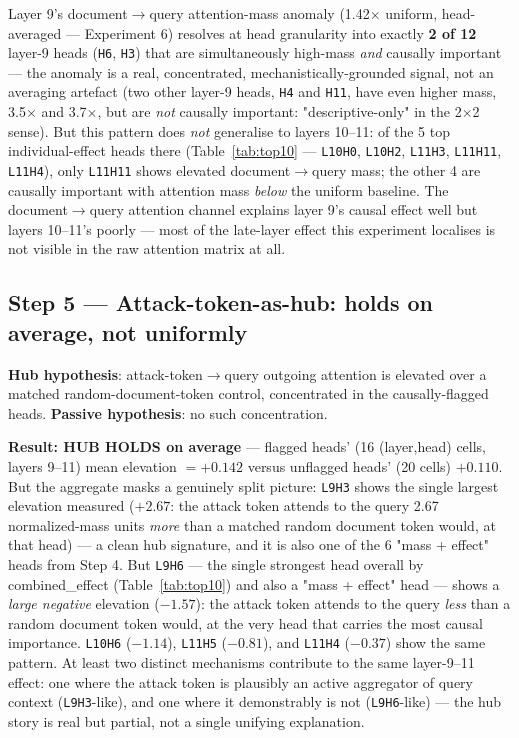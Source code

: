 \documentclass[11pt]{article}
\begin{document}
Layer 9's document$\to$query attention-mass anomaly (1.42$\times$ uniform, head-averaged
— Experiment 6) resolves at head granularity into exactly \textbf{2 of 12} layer-9 heads
(\texttt{H6}, \texttt{H3}) that are simultaneously high-mass \emph{and} causally
important — the anomaly is a real, concentrated, mechanistically-grounded signal, not an
averaging artefact (two other layer-9 heads, \texttt{H4} and \texttt{H11}, have even
higher mass, 3.5$\times$ and 3.7$\times$, but are \emph{not} causally important:
"descriptive-only" in the 2$\times$2 sense). But this pattern does \emph{not} generalise
to layers 10--11: of the 5 top individual-effect heads there
(Table~\ref{tab:top10} — \texttt{L10H0}, \texttt{L10H2}, \texttt{L11H3}, \texttt{L11H11},
\texttt{L11H4}), only \texttt{L11H11} shows elevated document$\to$query mass; the other 4
are causally important with attention mass \emph{below} the uniform baseline. The
document$\to$query attention channel explains layer 9's causal effect well but layers
10--11's poorly — most of the late-layer effect this experiment localises is not visible
in the raw attention matrix at all.

\subsection{Step 5 — Attack-token-as-hub: holds on average, not uniformly}

\textbf{Hub hypothesis}: attack-token$\to$query outgoing attention is elevated over a
matched random-document-token control, concentrated in the causally-flagged heads.
\textbf{Passive hypothesis}: no such concentration.

\textbf{Result: HUB HOLDS on average} — flagged heads' (16 (layer,head) cells, layers
9--11) mean elevation $= +0.142$ versus unflagged heads' (20 cells) $+0.110$. But the
aggregate masks a genuinely split picture: \texttt{L9H3} shows the single largest
elevation measured ($+2.67$: the attack token attends to the query 2.67 normalized-mass
units \emph{more} than a matched random document token would, at that head) — a clean hub
signature, and it is also one of the 6 "mass + effect" heads from Step 4. But
\texttt{L9H6} — the single strongest head overall by combined\_effect
(Table~\ref{tab:top10}) and also a "mass + effect" head — shows a \emph{large negative}
elevation ($-1.57$): the attack token attends to the query \emph{less} than a random
document token would, at the very head that carries the most causal importance.
\texttt{L10H6} ($-1.14$), \texttt{L11H5} ($-0.81$), and \texttt{L11H4} ($-0.37$) show the
same pattern. At least two distinct mechanisms contribute to the same layer-9--11 effect:
one where the attack token is plausibly an active aggregator of query context
(\texttt{L9H3}-like), and one where it demonstrably is not (\texttt{L9H6}-like) — the
hub story is real but partial, not a single unifying explanation.
\end{document}
